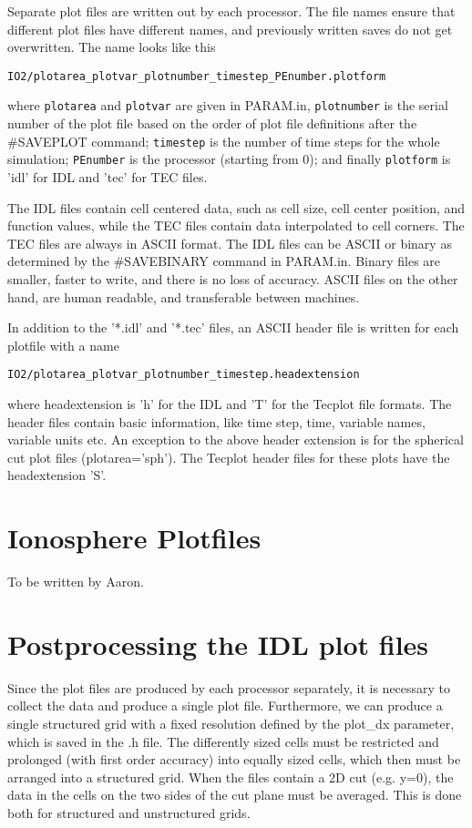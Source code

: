 Separate plot files are written out by each processor. The file names
ensure that different plot files have different names, and previously
written saves do not get overwritten. The name looks like this
\begin{verbatim}
IO2/plotarea_plotvar_plotnumber_timestep_PEnumber.plotform
\end{verbatim}
where {\tt plotarea} and {\tt plotvar} are given in PARAM.in,
{\tt plotnumber} is the serial number of the plot file based
on the order of plot file definitions after the \#SAVEPLOT command;
{\tt timestep} is the number of time steps for the whole simulation;
{\tt PEnumber} is the processor (starting from 0); and finally
{\tt plotform} is 'idl' for IDL and 'tec' for TEC files.

The IDL files contain cell centered data, such as cell size, cell center
position, and function values, while the TEC files contain
data interpolated to cell corners. The TEC files are always in ASCII
format.
The IDL files can be ASCII or binary as determined by the \#SAVEBINARY
command in PARAM.in. Binary files are
smaller, faster to write, and there is no loss of accuracy. ASCII files
on the other hand, are human readable, and transferable between machines.

In addition to the '*.idl' and '*.tec' files, an ASCII header file is written
for each plotfile with a name
\begin{verbatim}
IO2/plotarea_plotvar_plotnumber_timestep.headextension
\end{verbatim}
where headextension is 'h' for the IDL and 'T' for the Tecplot file formats.
The header files contain basic information, like time step, time,
variable names, variable units etc. An exception to the above header 
extension is for the spherical cut plot files (plotarea='sph').  
The Tecplot header files for these plots have the headextension 'S'.

\section{Ionosphere Plotfiles}
To be written by Aaron.

\section{Postprocessing the IDL plot files \label{section:postidl}}

Since the plot files are produced by each processor separately, it is
necessary to collect the data and produce a single plot file. 
Furthermore, we can produce a single structured grid with a fixed 
resolution defined by the plot\_dx parameter, which is saved in the .h file. 
The differently sized cells must be restricted and prolonged
(with first order accuracy) into equally sized cells, which then must be
arranged into a structured grid. When the files contain a 2D cut (e.g. y=0), 
the data in the cells on the two sides of the cut plane must be averaged.
This is done both for structured and unstructured grids.

